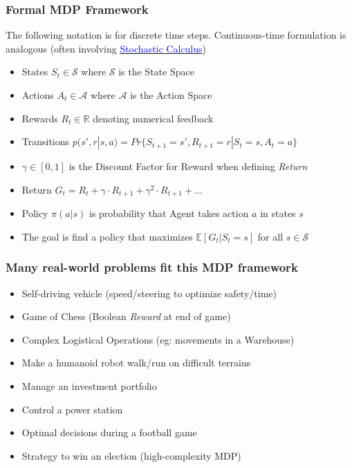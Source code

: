 \documentclass[handout]{beamer}
\begin{document}
\begin{frame}
\frametitle{Formal MDP Framework}
\pause
The following notation is for discrete time steps. Continuous-time formulation is analogous (often involving
\href{https://github.com/coverdrive/technical-documents/blob/master/finance/cme241/StochasticCalculusFoundations.pdf}{\underline{\textcolor{blue}{Stochastic Calculus}}})
\begin{itemize}[<+->]
\item States $S_t \in \mathcal{S}$ where $\mathcal{S}$ is the State Space
\item Actions $A_t \in \mathcal{A}$ where $\mathcal{A}$ is the Action Space
\item Rewards $R_t \in \mathbb{R}$ denoting numerical feedback\
\item Transitions $p(s',r|s,a) = Pr\{S_{t+1}=s',R_{t+1}=r|S_t=s,A_t=a\}$
\item $\gamma \in [0,1]$ is the Discount Factor for Reward when defining {\em Return}
\item Return $G_t = R_t + \gamma \cdot R_{t+1} + \gamma^2 \cdot R_{t+1} + \ldots$
\item Policy $\pi(a|s)$ is probability that Agent takes action $a$ in states $s$
\item The goal is find a policy that maximizes  $\mathbb{E}[G_t|S_t = s]$ for all $s \in \mathcal{S}$
\end{itemize}
\end{frame}

\begin{frame}
\frametitle{Many real-world problems fit this MDP framework}
\pause
\begin{itemize}[<+->]
\item Self-driving vehicle (speed/steering to optimize safety/time)
\item Game of Chess (Boolean {\em Reward} at end of game)
\item Complex Logistical Operations (eg: movements in a Warehouse)
\item Make a humanoid robot walk/run on difficult terrains
\item Manage an investment portfolio
\item Control a power station
\item Optimal decisions during a football game
\item Strategy to win an election (high-complexity MDP)
\end{itemize}
\end{frame}
\end{document}
